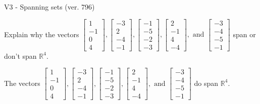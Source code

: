 \begin{exercise}
  \begin{exerciseTitle}V3 - Spanning sets (ver. 796)\end{exerciseTitle}
  \begin{exerciseStatement}
    Explain why the vectors \(\left[\begin{array}{r}
1 \\
-1 \\
0 \\
4
\end{array}\right] , \left[\begin{array}{r}
-3 \\
2 \\
-4 \\
-1
\end{array}\right] , \left[\begin{array}{r}
-1 \\
-5 \\
-2 \\
-3
\end{array}\right] , \left[\begin{array}{r}
2 \\
-1 \\
4 \\
-4
\end{array}\right] , \text{ and } \left[\begin{array}{r}
-3 \\
-4 \\
-5 \\
-1
\end{array}\right]\) span or don't span \(\mathbb{R}^4\). 
	


  \end{exerciseStatement}
  \begin{exerciseAnswer}
   The vectors \(\left[\begin{array}{r}
1 \\
-1 \\
0 \\
4
\end{array}\right] , \left[\begin{array}{r}
-3 \\
2 \\
-4 \\
-1
\end{array}\right] , \left[\begin{array}{r}
-1 \\
-5 \\
-2 \\
-3
\end{array}\right] , \left[\begin{array}{r}
2 \\
-1 \\
4 \\
-4
\end{array}\right] , \text{ and } \left[\begin{array}{r}
-3 \\
-4 \\
-5 \\
-1
\end{array}\right]\) 
  	 do  
	span \(\mathbb{R}^4\).
  



\end{exerciseAnswer}
\end{exercise}
